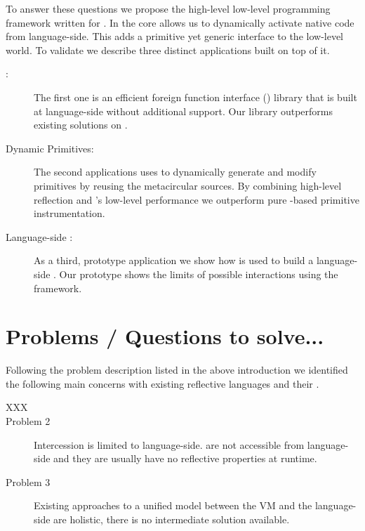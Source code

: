 To answer these questions we propose the high-level low-level programming framework \B written for \PH.
In the core \B allows us to dynamically activate native code from language-side.
This adds a primitive yet generic interface to the low-level \VM world.
To validate \B we describe three distinct applications built on top of it.
%
\begin{description}
	\item[\FFI:] The first one is an efficient foreign function interface (\FFI) library that is built at language-side without additional \VM support.
	Our \FFI library outperforms existing solutions on \PH.
	
	\item[Dynamic Primitives:] The second applications uses \B to dynamically generate and modify \PH primitives by reusing the metacircular \VM sources.
	By combining high-level reflection and \B's low-level performance we outperform pure \PH-based primitive instrumentation.
	
	\item[Language-side \JIT:] As a third, prototype application we show how \B is used to build a language-side \JIT.
	Our prototype shows the limits of possible \VM interactions using the \B framework. 
\end{description}


\section{Problems / Questions to solve...}
Following the problem description listed in the above introduction we identified the following main concerns with existing reflective languages and their \VMs.
%
\begin{description}
	\item[XXX]
		
	\item[Problem 2] Intercession is limited to language-side.
	\VMs are not accessible from language-side and they are usually have no reflective properties at runtime. 
	
	\item[Problem 3] Existing approaches to a unified model between the VM and the language-side are holistic, there is no intermediate solution available.
\end{description}


